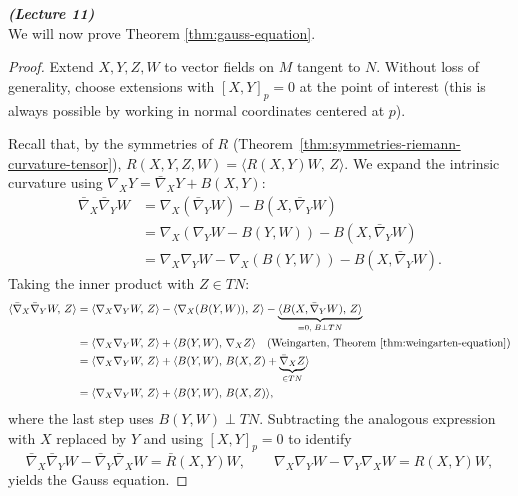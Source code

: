 

\vspace{0.4cm}\emph{\textbf{(Lecture 11)}}\\







We will now prove Theorem \ref{thm:gauss-equation}.

\begin{proof}
Extend $X, Y, Z, W$ to vector fields on $M$ tangent to $N$. Without loss of generality, choose extensions with $[X, Y]_p = 0$ at the point of interest (this is always possible by working in normal coordinates centered at $p$).

Recall that, by the symmetries of $R$ (Theorem~\ref{thm:symmetries-riemann-curvature-tensor}), $R(X, Y, Z, W) = \langle R(X, Y) W,\, Z\rangle$. We expand the intrinsic curvature using $\nabla_X Y = \bar\nabla_X Y + B(X, Y)$:
\begin{align*}
\bar\nabla_X \bar\nabla_Y W 
&= \nabla_X(\bar\nabla_Y W) - B(X, \bar\nabla_Y W) \\
&= \nabla_X(\nabla_Y W - B(Y, W)) - B(X, \bar\nabla_Y W) \\
&= \nabla_X \nabla_Y W - \nabla_X(B(Y, W)) - B(X, \bar\nabla_Y W).
\end{align*}
Taking the inner product with $Z \in TN$:
\begin{align*}
\langle \bar\nabla_X \bar\nabla_Y W,\, Z\rangle 
&= \langle \nabla_X \nabla_Y W,\, Z\rangle - \langle \nabla_X(B(Y, W)),\, Z\rangle - \underbrace{\langle B(X, \bar\nabla_Y W),\, Z\rangle}_{= 0,\; B \perp TN} \\
&= \langle \nabla_X \nabla_Y W,\, Z\rangle + \langle B(Y, W),\, \nabla_X Z\rangle \quad \text{(Weingarten, Theorem~\ref{thm:weingarten-equation})} \\
&= \langle \nabla_X \nabla_Y W,\, Z\rangle + \langle B(Y, W),\, B(X, Z) + \underbrace{\bar\nabla_X Z}_{\in TN}\rangle \\
&= \langle \nabla_X \nabla_Y W,\, Z\rangle + \langle B(Y, W),\, B(X, Z)\rangle,
\end{align*}
where the last step uses $B(Y, W) \perp TN$. Subtracting the analogous expression with $X$ replaced by $Y$ and using $[X, Y]_p = 0$ to identify
\[
\bar\nabla_X \bar\nabla_Y W - \bar\nabla_Y \bar\nabla_X W = \bar R(X, Y) W, \qquad \nabla_X \nabla_Y W - \nabla_Y \nabla_X W = R(X, Y) W,
\]
yields the Gauss equation. \qedhere
\end{proof}


